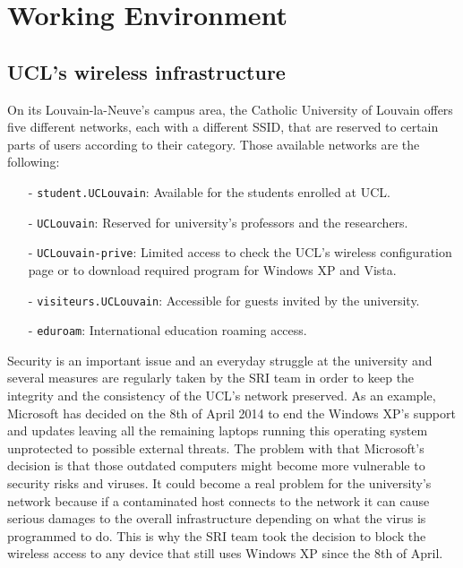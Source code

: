 
\chapter{Working Environment} %

\label{Chapter2} %




\section{UCL's wireless infrastructure}

On its Louvain-la-Neuve's campus area, the Catholic University of Louvain offers five different networks, each with a different SSID, that are reserved to certain parts of users according to their category. Those available networks are the following:
\begin{itemize}
	\item[-] \texttt{student.UCLouvain}: Available for the students enrolled at UCL.
	\item[-] \texttt{UCLouvain}: Reserved for university's professors and the researchers.
	\item[-] \texttt{UCLouvain-prive}: Limited access to check the UCL's wireless configuration page or to download required program for Windows XP and Vista.
	\item[-] \texttt{visiteurs.UCLouvain}: Accessible for guests invited by the university.
	\item[-] \texttt{eduroam}: International education roaming access.
\end{itemize}

Security is an important issue and an everyday struggle at the university and several measures are regularly taken by the SRI team in order to keep the integrity and the consistency of the UCL's network preserved. As an example, Microsoft has decided on the 8th of April 2014 to end the Windows XP's support and updates leaving all the remaining laptops running this operating system unprotected to possible external threats\cite{windows}. The problem with that Microsoft's decision is that those outdated computers might become more vulnerable to security risks and viruses. It could become a real problem for the university's network because if a contaminated host connects to the network it can cause serious damages to the overall infrastructure depending on what the virus is programmed to do. This is why the SRI team took the decision to block the wireless access to any device that still uses Windows XP since the 8th of April.

